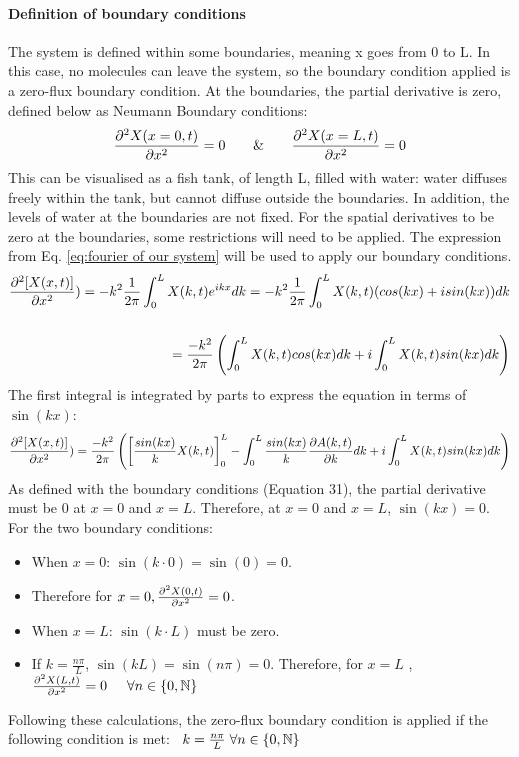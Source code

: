 \paragraph{Definition of boundary conditions}
The system is defined within some boundaries, meaning x goes from 0 to L. In this case, no molecules can leave the system, so the boundary condition applied is a zero-flux boundary condition. At the boundaries, the partial derivative is zero, defined below as Neumann Boundary conditions:
\begin{equation}
    \pdvn{2}{X(x=0,t)}{x}=0  \hspace{0.5cm}\And  \hspace{0.5cm}\pdvn{2}{X(x=L,t)}{x}=0
\end{equation}
This can be visualised as a fish tank, of length L, filled with water: water diffuses freely within the tank, but cannot diffuse outside the boundaries. In addition, the levels of water at the boundaries are not fixed. For the spatial derivatives to be zero at the boundaries, some restrictions will need to be applied. The expression from Eq. \eqref{eq:fourier of our system} will be used to apply our boundary conditions.
\begin{equation}
    \begin{split}
        \frac{\partial^{2} {[X(x,t)]}}{\partial {x}^{2}}) =  -k^2 \frac{1}{2\pi}\int_{0}^{L} X(k,t)e^{ikx} dk =  -k^2 \frac{1}{2\pi}\int_{0}^{L} X(k,t)(cos(kx)+isin(kx))dk\\\\
        =\frac{-k^2}{2\pi}\left(\int_{0}^{L} X(k,t)cos(kx)dk + i\int_{0}^{L} X(k,t)sin(kx)dk\right)
    \end{split}
\end{equation}
The first integral is integrated by parts to express the equation in terms of $\sin(kx)$:
\begin{equation}
    \begin{split}
        \frac{\partial^{2} {[X(x,t)]}}{\partial {x}^{2}}) = \frac{-k^2}{2\pi}\left(\left[\frac{sin(kx)}{k}X(k,t)\right]^L_{0} - \int_{0}^{L} \frac{sin(kx)}{k}\pdv{A(k,t)}{k}dk + i\int_{0}^{L} X(k,t)sin(kx)dk\right)
    \end{split}
\end{equation}
As defined with the boundary conditions (Equation 31), the partial derivative must be 0 at $x=0$ and  $x=L$.
Therefore, at $x=0$ and  $x=L$, $\sin(kx)=0$.
For the two boundary conditions:
\begin{itemize}
    \item When $x=0$: $\sin(k\cdot0)=\sin(0)=0$.
    \item Therefore for $x=0,\frac{\partial^{2} {X(0,t)}}{\partial {x}^{2}}=0$.
    \item When $x=L$: $\sin(k\cdot L)$ must be zero.
    \item If $ k=\frac{n\pi}{L}$, $\sin(kL) = \sin(n\pi) = 0$.
    Therefore, for $x=L$ , $\frac{\partial^{2} {X(L,t)}}{\partial {x}^{2}}=0 \hspace{0.5cm} \forall n \in \{0, \mathbb{N}\} $
\end{itemize}
Following these calculations, the zero-flux boundary condition is applied if the following condition is met:  ~$k=\frac{n\pi}{L} \hspace{0.1cm}\forall n \in \{0, \mathbb{N}\} $

